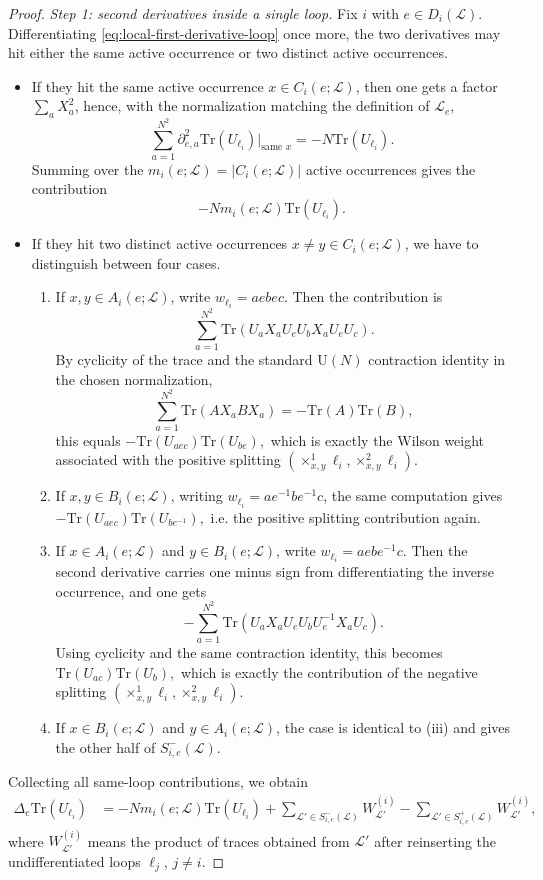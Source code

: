 \documentclass[10pt,a4paper]{amsart}
\newcommand\Lc{{\mathcal{L}}}
\newcommand\Tr{\mathrm{Tr}}
\newcommand\U{{\mathrm U}}
\begin{document}
\begin{proof}
\emph{Step 1: second derivatives inside a single loop.}
Fix $i$ with $e\in D_i(\Lc)$. Differentiating \eqref{eq:local-first-derivative-loop} once more, the two derivatives may hit either the same active occurrence or two distinct active occurrences.
\begin{itemize}
\item If they hit the same active occurrence $x\in C_i(e;\Lc)$, then one gets a factor $\sum_a X_a^2$, hence, with the normalization matching the definition of $\Lc_e$,
\[
\sum_{a=1}^{N^2}\partial_{e,a}^2 \Tr(U_{\ell_i})\Big|_{\text{same }x}=-N\Tr(U_{\ell_i}).
\]
Summing over the $m_i(e;\Lc)=|C_i(e;\Lc)|$ active occurrences gives the contribution
\[
-Nm_i(e;\Lc)\Tr(U_{\ell_i}).
\]
\item If they hit two distinct active occurrences $x\neq y\in C_i(e;\Lc)$, we have to distinguish between four cases.
\begin{enumerate}
\item If $x,y\in A_i(e;\Lc)$, write $w_{\ell_i}=aebec$. Then the contribution is
\[
\sum_{a=1}^{N^2}\Tr(U_aX_aU_eU_bX_aU_eU_c).
\]
By cyclicity of the trace and the standard $\U(N)$ contraction identity in the chosen
normalization,
\[
\sum_{a=1}^{N^2}\Tr(AX_aBX_a)=-\Tr(A)\Tr(B),
\]
this equals $-\Tr(U_{aec})\Tr(U_{be}),$ which is exactly the Wilson weight associated with the positive splitting $(\times^1_{x,y}\ell_i,\times^2_{x,y}\ell_i)$.
\item If $x,y\in B_i(e;\Lc)$, writing $w_{\ell_i}=ae^{-1}be^{-1}c$, the same computation gives $-\Tr(U_{aec})\Tr(U_{be^{-1}}),$
 i.e. the positive splitting contribution again.
\item If $x\in A_i(e;\Lc)$ and $y\in B_i(e;\Lc)$, write $w_{\ell_i}=aebe^{-1}c$. Then the second
derivative carries one minus sign from differentiating the inverse occurrence, and one gets
\[
-\sum_{a=1}^{N^2}\Tr(U_aX_aU_eU_bU_e^{-1}X_aU_c).
\]
Using cyclicity and the same contraction identity, this becomes $\Tr(U_{ac})\Tr(U_b),$ which is exactly the contribution of the negative splitting $(\times^1_{x,y}\ell_i,\times^2_{x,y}\ell_i)$.
\item If $x\in B_i(e;\Lc)$ and $y\in A_i(e;\Lc)$, the case is identical to (iii) and gives the other half of
$S^-_{i,e}(\Lc)$.
\end{enumerate}
\end{itemize}

Collecting all same-loop contributions, we obtain
\begin{align}
\Delta_e\Tr(U_{\ell_i}) &=-Nm_i(e;\Lc)\Tr(U_{\ell_i})+ \sum_{\Lc'\in S^-_{i,e}(\Lc)} W_{\Lc'}^{(i)}- \sum_{\Lc'\in S^+_{i,e}(\Lc)} W_{\Lc'}^{(i)},\label{eq:single-loop-Laplacian}
\end{align}
where $W_{\Lc'}^{(i)}$ means the product of traces obtained from $\Lc'$ after reinserting the undifferentiated loops $\ell_j$, $j\neq i$.


\end{proof}
\end{document}
